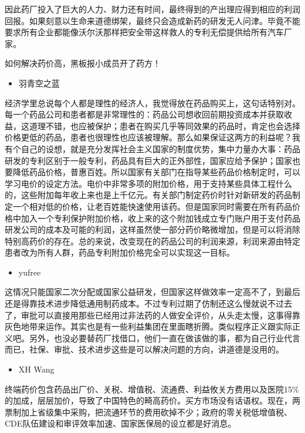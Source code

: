 \documentclass[
]{book}
\providecommand{\tightlist}{%
  \setlength{\itemsep}{0pt}\setlength{\parskip}{0pt}}
\begin{document}
因此药厂投入了巨大的人力、财力还有时间，最终得到的产出理应得到相应的利润回报。如果刻意以生命来道德绑架，最终只会造成新药的研发无人问津。毕竟不能要求所有企业都能像沃尔沃那样把安全带这样救人的专利无偿提供给所有汽车厂家。

如何解决药价高，黑板报小成员开了药方！

\begin{itemize}
\tightlist
\item
  羽青空之蓝
\end{itemize}

经济学里总说每个人都是理性的经济人，我觉得放在药品购买上，这句话特别对。每一个药品公司和患者都是非常理性的：药品公司想收回前期投资成本并获取收益，这道理不错，也应被保护；患者在购买几乎等同效果的药品时，肯定也会选择价格更低的药品，患者也很理性也应该被理解。那么如果保证这两方的利益呢？我有个自己的设想，就是充分发挥社会主义国家的制度优势，集中力量办大事：药品研发的专利区别于一般专利，药品具有巨大的正外部性，国家应给予保护；国家也要降低药品价格，普惠百姓。所以国家有关部门在指导某些药品价格制定时，可以学习电价的设定方法。电价中非常多项的附加价格，用于支持某些具体工程什么的，这些附加每年收上来也是上千亿元。有关部门制定药价时针对新研发的药品制定一个相对低的价格，让老百姓能快速使用该药。但是国家同时需要在所有药品价格中加入一个专利保护附加价格，收上来的这个附加钱成立专门账户用于支付药品研发公司的成本及可能的利润，这样虽然使一部分药价略微增加，但是可以将消除特别高药价的存在。总的来说，改变现在的药品公司的利润来源，利润来源由特定患者改为所有人群，药品专利附加价格完全可以实现这一目标。

\begin{itemize}
\tightlist
\item
  yufree
\end{itemize}

这情况只能国家二次分配或国家公益研发，但国家这样做效率一定高不了，到最后还是得靠技术进步降低通用制药成本。不过专利过期了仿制还这么慢就说不过去了，审批可以直接用那些已经用过非法药的人做安全评价，从头走太慢，这事得靠灰色地带来运作。其实也是有一些利益集团在里面瞎折腾。类似程序正义跟实际正义吧。另外，也没必要替药厂找借口，他们一直在做该做的事，都为自己行业代言而已，社保、审批、技术进步这些是可以解决问题的方向，讲道德是没用的。

\begin{itemize}
\tightlist
\item
  XH Wang
\end{itemize}

终端药价包含药品出厂价、关税、增值税、流通费、利益攸关方费用以及医院15\%的加成，层层加价，导致了中国特色的畸高药价。买方市场没有话语权。现在，两票制加上省级集中采购，把流通环节的费用砍掉不少；政府的零关税低增值税、CDE队伍建设和审评效率加速、国家医保局的设立都是好消息。
\end{document}
